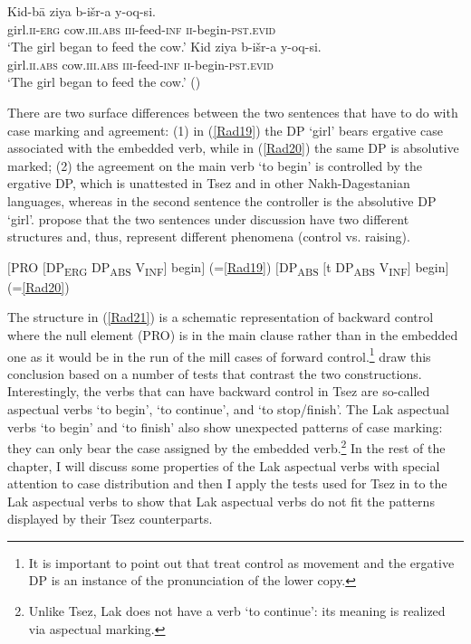 \documentclass[output=paper]{langscibook}
\begin{document}
\ea\label{Rad19}
\gll Kid-bā 	ziya b-išr-a y-oq-si.\\
girl.\textsc{ii-erg} cow.\textsc{iii.abs} \textsc{iii}-feed-\textsc{inf} \textsc{ii}-begin-\textsc{pst.evid}\\
\glt ‘The girl began to feed the cow.’
\ex\label{Rad20}
\gll Kid 	ziya b-išr-a y-oq-si.\\
girl.\textsc{ii.abs} cow.\textsc{iii.abs} \textsc{iii}-feed-\textsc{inf} \textsc{ii}-begin-\textsc{pst.evid}\\
\glt ‘The girl began to feed the cow.’ (\citealt[248--249]{PolinskyPotsdam2002})
\z

There are two surface differences between the two sentences that have to do with case marking and agreement: (1) in (\ref{Rad19}) the DP ‘girl’ bears ergative case associated with the embedded verb, while in (\ref{Rad20}) the same DP is absolutive marked; (2) the agreement on the main verb ‘to begin’  is controlled by the ergative DP, which is unattested in Tsez and in other Nakh-Dagestanian languages, whereas in the second sentence the controller is the absolutive DP ‘girl’. \citet{PolinskyPotsdam2002} propose that the two sentences under discussion have two different structures and, thus, represent different phenomena (control vs. raising). 

\ea\label{Rad21}
$[$PRO $[$DP\textsubscript{ERG} DP\textsubscript{ABS} V\textsubscript{INF}$]$ begin$]$ (=\ref{Rad19})
\ex\label{Rad22}
$[$DP\textsubscript{ABS} $[$t DP\textsubscript{ABS} V\textsubscript{INF}$]$ begin$]$ (=\ref{Rad20})
\z

The structure in (\ref{Rad21}) is a schematic representation of backward control where the null element (PRO) is in the main clause rather than in the embedded one as it would be in the run of the mill cases of forward control.\footnote{It is important to point out that \citet{PolinskyPotsdam2002} treat control as movement \citep{hornstein1999} and the ergative DP is an instance of the pronunciation of the lower copy.} \citet{PolinskyPotsdam2002} draw this conclusion based on a number of tests that contrast the two constructions. Interestingly, the verbs that can have backward control in Tsez are so-called aspectual verbs ‘to begin’, ‘to continue’, and ‘to stop/finish’. The Lak aspectual verbs ‘to begin’ and ‘to finish’ also show unexpected patterns of case marking: they can only bear the case assigned by the embedded verb.\footnote{Unlike Tsez, Lak does not have a verb ‘to continue’: its meaning is realized via aspectual marking.} In the rest of the chapter, I will discuss some properties of the Lak aspectual verbs with special attention to case distribution and then I apply the tests used for Tsez in \citet{PolinskyPotsdam2002} to the Lak aspectual verbs to show that Lak aspectual verbs do not fit the patterns displayed by their Tsez counterparts.
\end{document}
